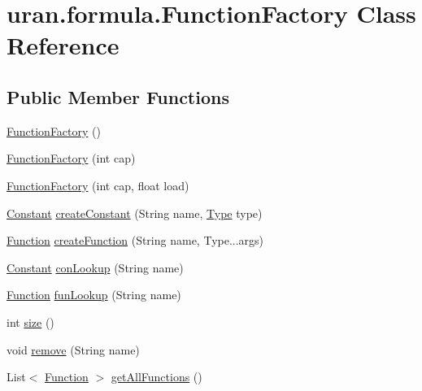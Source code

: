 \hypertarget{classuran_1_1formula_1_1_function_factory}{}\section{uran.\+formula.\+Function\+Factory Class Reference}
\label{classuran_1_1formula_1_1_function_factory}
\subsection*{Public Member Functions}
\begin{DoxyCompactItemize}
\item 
\hyperlink{classuran_1_1formula_1_1_function_factory_a93f76edeabe521e3b90377bb89cbb725}{Function\+Factory} ()
\item 
\hyperlink{classuran_1_1formula_1_1_function_factory_a38475ef8d6732b1f8f3fca34624791e1}{Function\+Factory} (int cap)
\item 
\hyperlink{classuran_1_1formula_1_1_function_factory_ab68f793821a4bc035673156bc7bc238e}{Function\+Factory} (int cap, float load)
\item 
\hyperlink{classuran_1_1formula_1_1_constant}{Constant} \hyperlink{classuran_1_1formula_1_1_function_factory_acaf3bd05dd854be14c7b7347a5cfe970}{create\+Constant} (String name, \hyperlink{classuran_1_1formula_1_1type_1_1_type}{Type} type)
\item 
\hyperlink{classuran_1_1formula_1_1_function}{Function} \hyperlink{classuran_1_1formula_1_1_function_factory_a49fb8c9efb968aa482706abbbf2deaa3}{create\+Function} (String name, Type...\+args)
\item 
\hyperlink{classuran_1_1formula_1_1_constant}{Constant} \hyperlink{classuran_1_1formula_1_1_function_factory_a3e2c6df5ad1b23b8b51d4775d1953a94}{con\+Lookup} (String name)
\item 
\hyperlink{classuran_1_1formula_1_1_function}{Function} \hyperlink{classuran_1_1formula_1_1_function_factory_a644cfc1803a1827e9ce03c26d6cf120d}{fun\+Lookup} (String name)
\item 
int \hyperlink{classuran_1_1formula_1_1_function_factory_ab939a92375538a729125986017109ccf}{size} ()
\item 
void \hyperlink{classuran_1_1formula_1_1_function_factory_abf9ab36c0b659982eb78945e595bfe98}{remove} (String name)
\item 
List$<$ \hyperlink{classuran_1_1formula_1_1_function}{Function} $>$ \hyperlink{classuran_1_1formula_1_1_function_factory_aec5c1bcbc24e6b9a9a292951ede73842}{get\+All\+Functions} ()

\end{DoxyCompactItemize}
